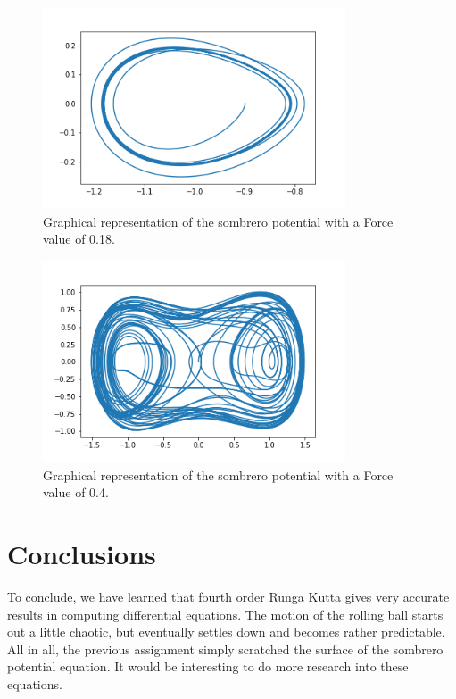 \documentclass[aps,pra,notitlepage,amsmath,amssymb,letterpaper,12pt]{revtex4-1}
\begin{document}
\begin{figure}[h!] %
  \includegraphics[width=0.8\textwidth]{sombrero2.png}  %
  \caption{Graphical representation of the sombrero potential with a Force value of 0.18.}
  \label{fig:figlabel}
\end{figure}

\begin{figure}[h!] %
  \includegraphics[width=0.8\textwidth]{sombrero3.png}  %
  \caption{Graphical representation of the sombrero potential with a Force value of 0.4.}
  \label{fig:figlabel}
\end{figure}

\section{Conclusions}

To conclude, we have learned that fourth order Runga Kutta gives very accurate results in computing differential equations. The motion of the rolling ball starts out a little chaotic, but eventually settles down and becomes rather predictable. All in all, the previous assignment simply scratched the surface of the sombrero potential equation. It would be interesting to do more research into these equations.

 
\end{document}
